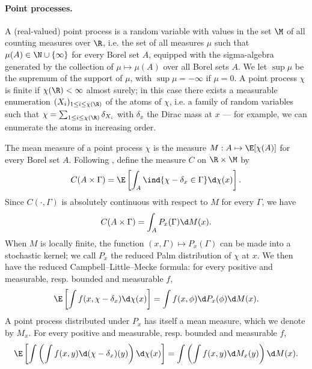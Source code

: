 \documentclass[10pt,a4paper]{article}
\begin{document}
\paragraph{Point processes.}
A (real-valued) point process is a random variable with values in the set $\M$ of all counting measures over $\R$, i.e. the set of all measures $\mu$ such that $\mu(A) \in \N \cup \{\infty\}$ for every Borel set $A$, equipped with the sigma-algebra generated by the collection of $\mu \mapsto \mu(A)$ over all Borel sets $A$. %
We let $\sup \mu$ be the supremum of the support of $\mu$, with $\sup\mu = -\infty$ if $\mu = 0$. 
A point process $\chi$ is finite if $\chi(\R)<\infty$ almost surely; in this case there exists a measurable enumeration $(X_i)_{1\leq i \leq \chi(\R)}$ of the atoms of $\chi$, i.e. a family of random variables such that $\chi = \sum_{1\leq i \leq \chi(\R)} \delta_{X_i}$ with $\delta_x$ the Dirac mass at $x$ --- for example, we can enumerate the atoms in increasing order. %

The mean measure of a point process $\chi$ is the measure $M : A \mapsto \E[\chi(A)]$ for every Borel set $A$. Following \cite{baccelli2009stochastic}, define the measure $C$ on $\R\times \M$ by 
\[ C(A \times \Gamma) = \E\left[ \int_A \ind{\chi - \delta_x \in \Gamma} \d \chi(x) \right] . \]
Since $C(\cdot , \Gamma)$ is absolutely continuous with respect to $M$ for every $\Gamma$, we have 
\[ C(A\times \Gamma) = \int_A P_x(\Gamma) \d M(x) . \]
When $M$ is locally finite, the function $(x,\Gamma) \mapsto P_x(\Gamma)$ can be made into a stochastic kernel; we call $P_x$ the reduced Palm distribution of $\chi$ at $x$. We then have the reduced Campbell--Little--Mecke formula: for every positive and measurable, resp. bounded and measurable $f$, 
\begin{equation}\label{eq:Campbell-Little-Mecke}
\E\left[\int f(x, \chi-\delta_x) \d \chi(x) \right] = \int f(x, \phi) \d P_x(\phi) \d M(x) .
\end{equation}
A point process distributed under $P_x$ has itself a mean measure, which we denote by $M_x$. For every positive and measurable, resp. bounded and measurable $f$,  
\begin{equation}\label{eq:Campbell-Little-Mecke-mean}
\E\left[\int \left(\int f(x,y) \d(\chi-\delta_x)(y)\right) \d\chi(x) \right] = \int \left( \int f(x, y) \d M_x(y) \right) \d M(x) .
\end{equation}
\end{document}
